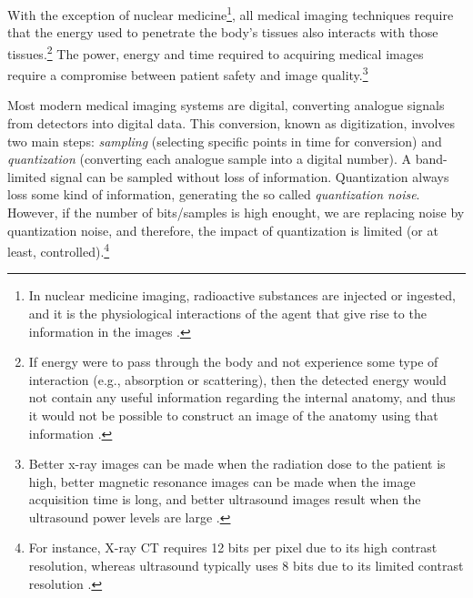 
With the exception of nuclear medicine\footnote{In nuclear medicine
  imaging, radioactive substances are injected or ingested, and it is
  the physiological interactions of the agent that give rise to the
  information in the images \cite{bushberg2011essential}.}, all
medical imaging techniques require that the energy used to penetrate
the body’s tissues also interacts with those tissues.\footnote{If
  energy were to pass through the body and not experience some type of
  interaction (e.g., absorption or scattering), then the detected
  energy would not contain any useful information regarding the
  internal anatomy, and thus it would not be possible to construct an
  image of the anatomy using that information
  \cite{bushberg2011essential}.} The power, energy and time required
to acquiring medical images require a compromise between patient
safety and image quality.\footnote{Better x-ray images can be made
  when the radiation dose to the patient is high, better magnetic
  resonance images can be made when the image acquisition time is
  long, and better ultrasound images result when the ultrasound power
  levels are large \cite{bushberg2011essential}.}

Most modern medical imaging systems are digital, converting analogue
signals from detectors into digital data. This conversion, known as
digitization, involves two main steps: \emph{sampling} (selecting
specific points in time for conversion) and \emph{quantization}
(converting each analogue sample into a digital number). A
band-limited signal can be sampled without loss of
information. Quantization always loss some kind of information,
generating the so called \emph{quantization noise}. However, if the
number of bits/samples is high enought, we are replacing noise by
quantization noise, and therefore, the impact of quantization is
limited (or at least, controlled).\footnote{For instance, X-ray CT
  requires 12 bits per pixel due to its high contrast resolution,
  whereas ultrasound typically uses 8 bits due to its limited contrast
  resolution \cite{bushberg2011essential}.}

